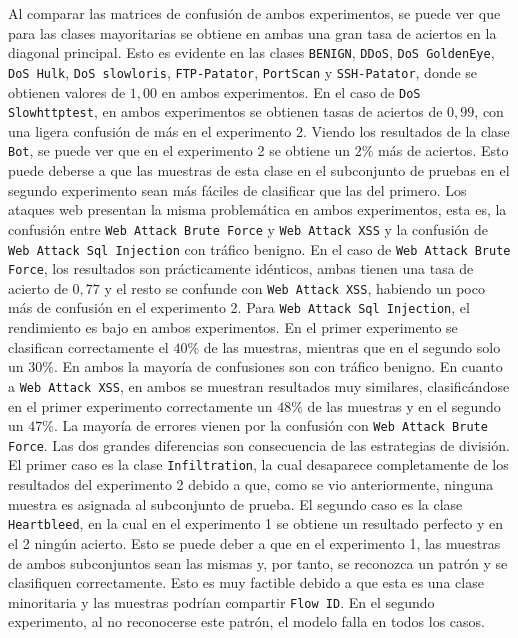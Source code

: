 Al comparar las matrices de confusión de ambos experimentos, se puede ver que para las clases mayoritarias se obtiene en ambas una gran tasa de aciertos en la diagonal principal. Esto es evidente en  las clases \texttt{BENIGN}, \texttt{DDoS}, \texttt{DoS GoldenEye}, \texttt{DoS Hulk}, \texttt{DoS slowloris}, \texttt{FTP-Patator}, \texttt{PortScan} y \texttt{SSH-Patator}, donde se obtienen valores de $1,00$ en ambos experimentos. 
En el caso de \texttt{DoS Slowhttptest}, en ambos experimentos se obtienen tasas de aciertos de $0,99$, con una ligera confusión de más en el experimento 2. Viendo los resultados de la clase \texttt{Bot}, se puede ver que en el experimento 2 se obtiene un $2\%$ más de aciertos. Esto puede deberse a que las muestras de esta clase en el subconjunto de pruebas en el segundo experimento sean más fáciles de clasificar que las del primero.
Los ataques web presentan la misma problemática en ambos experimentos, esta es, la confusión entre \texttt{Web Attack Brute Force} y \texttt{Web Attack XSS} y la confusión de \texttt{Web Attack Sql Injection} con tráfico benigno. En el caso de \texttt{Web Attack Brute Force}, los resultados son prácticamente idénticos, ambas tienen una tasa de acierto de $0,77$ y el resto se confunde con \texttt{Web Attack XSS}, habiendo un poco más de confusión en el experimento 2. Para \texttt{Web Attack Sql Injection}, el rendimiento es bajo en ambos experimentos. En el primer experimento se clasifican correctamente el $40\%$ de las muestras, mientras que en el segundo solo un $30\%$. En ambos la mayoría de confusiones son con tráfico benigno. En cuanto a \texttt{Web Attack XSS}, en ambos se muestran resultados muy similares, clasificándose en el primer experimento correctamente un $48\%$ de las muestras y en el segundo un $47\%$. La mayoría de errores vienen por la confusión con \texttt{Web Attack Brute Force}.
Las dos grandes diferencias son consecuencia de las estrategias de división. El primer caso es la clase \texttt{Infiltration}, la cual desaparece completamente de los resultados del experimento 2 debido a que, como se vio anteriormente, ninguna muestra es asignada al subconjunto de prueba. El segundo caso es la clase \texttt{Heartbleed}, en la cual en el experimento 1 se obtiene un resultado perfecto y en el 2 ningún acierto. Esto se puede deber a que en el experimento 1, las muestras de ambos subconjuntos sean las mismas y, por tanto, se reconozca un patrón y se clasifiquen correctamente. Esto es muy factible debido a que esta es una clase minoritaria y las muestras podrían compartir \texttt{Flow ID}. En el segundo experimento, al no reconocerse este patrón, el modelo falla en todos los casos.

